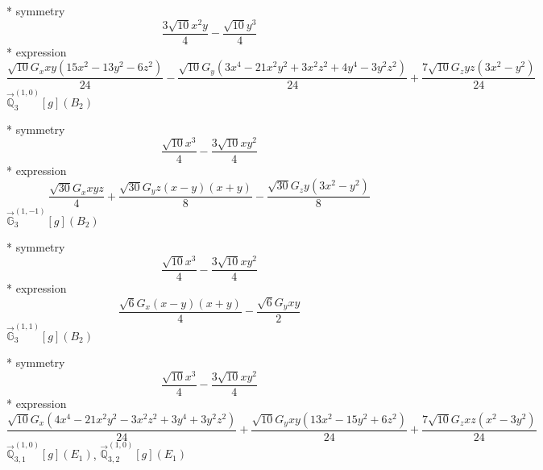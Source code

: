 \documentclass[fleqn,8pt]{jsarticle}
\begin{document}
\noindent\quad ** symmetry
\begin{dmath*}
\frac{3 \sqrt{10} x^{2} y}{4} - \frac{\sqrt{10} y^{3}}{4}
\end{dmath*}
\noindent\quad ** expression
\begin{dmath*}
\frac{\sqrt{10} G_{x} x y \left(15 x^{2} - 13 y^{2} - 6 z^{2}\right)}{24} - \frac{\sqrt{10} G_{y} \left(3 x^{4} - 21 x^{2} y^{2} + 3 x^{2} z^{2} + 4 y^{4} - 3 y^{2} z^{2}\right)}{24} + \frac{7 \sqrt{10} G_{z} y z \left(3 x^{2} - y^{2}\right)}{24}
\end{dmath*}
\noindent\quad $\vec{\mathbb{Q}}_{3}^{(1,0)}[g](B_{2})$

\noindent\quad ** symmetry
\begin{dmath*}
\frac{\sqrt{10} x^{3}}{4} - \frac{3 \sqrt{10} x y^{2}}{4}
\end{dmath*}
\noindent\quad ** expression
\begin{dmath*}
\frac{\sqrt{30} G_{x} x y z}{4} + \frac{\sqrt{30} G_{y} z \left(x - y\right) \left(x + y\right)}{8} - \frac{\sqrt{30} G_{z} y \left(3 x^{2} - y^{2}\right)}{8}
\end{dmath*}
\noindent\quad $\vec{\mathbb{G}}_{3}^{(1,-1)}[g](B_{2})$

\noindent\quad ** symmetry
\begin{dmath*}
\frac{\sqrt{10} x^{3}}{4} - \frac{3 \sqrt{10} x y^{2}}{4}
\end{dmath*}
\noindent\quad ** expression
\begin{dmath*}
\frac{\sqrt{6} G_{x} \left(x - y\right) \left(x + y\right)}{4} - \frac{\sqrt{6} G_{y} x y}{2}
\end{dmath*}
\noindent\quad $\vec{\mathbb{G}}_{3}^{(1,1)}[g](B_{2})$

\noindent\quad ** symmetry
\begin{dmath*}
\frac{\sqrt{10} x^{3}}{4} - \frac{3 \sqrt{10} x y^{2}}{4}
\end{dmath*}
\noindent\quad ** expression
\begin{dmath*}
\frac{\sqrt{10} G_{x} \left(4 x^{4} - 21 x^{2} y^{2} - 3 x^{2} z^{2} + 3 y^{4} + 3 y^{2} z^{2}\right)}{24} + \frac{\sqrt{10} G_{y} x y \left(13 x^{2} - 15 y^{2} + 6 z^{2}\right)}{24} + \frac{7 \sqrt{10} G_{z} x z \left(x^{2} - 3 y^{2}\right)}{24}
\end{dmath*}
\noindent\quad $\vec{\mathbb{Q}}_{3,1}^{(1,0)}[g](E_{1})$, $\vec{\mathbb{Q}}_{3,2}^{(1,0)}[g](E_{1})$
\end{document}
